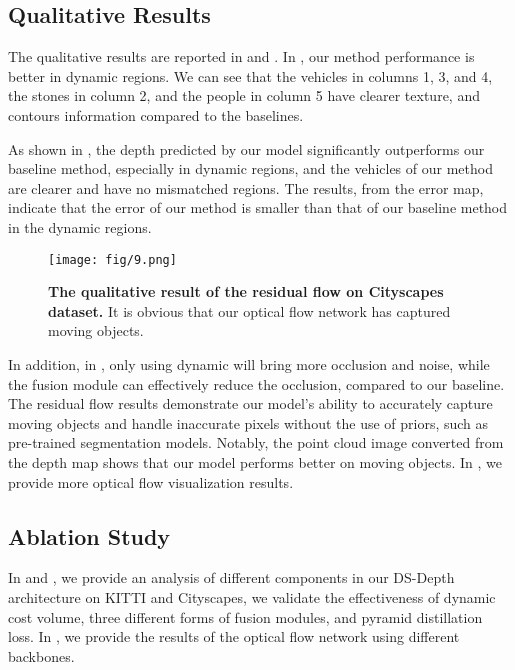 \documentclass[journal]{IEEEtran}
\begin{document}
\subsection{Qualitative Results}
The qualitative results are reported in  and . In , our method performance is better in dynamic regions. We can see that the vehicles in columns 1, 3, and 4, the stones in column 2, and the people in column 5 have clearer texture, and contours information compared to the baselines.

As shown in , the depth predicted by our model significantly outperforms our baseline method, especially in dynamic regions, and the vehicles of our method are clearer and have no mismatched regions. The results, from the error map, indicate that the error of our method is smaller than that of our baseline method in the dynamic regions.


\begin{figure*}
\centering
\texttt{[image: fig/9.png]}
\caption{\textbf{The qualitative result of the residual flow on Cityscapes dataset.} It is obvious that our optical flow network has captured moving objects.}
\label{fig:13}
\end{figure*}

In addition, in , only using dynamic will bring more occlusion and noise, while the fusion module can effectively reduce the occlusion, compared to our baseline. The residual flow results demonstrate our model's ability to accurately capture moving objects and handle inaccurate pixels without the use of priors, such as pre-trained segmentation models. Notably, the point cloud image converted from the depth map shows that our model performs better on moving objects. In , we provide more optical flow visualization results.


\subsection{Ablation Study}
In  and , we provide an analysis of different components in our DS-Depth architecture on KITTI and Cityscapes, we validate the effectiveness of dynamic cost volume, three different forms of fusion modules, and pyramid distillation loss. In , we provide the results of the optical flow network using different backbones.
\end{document}
